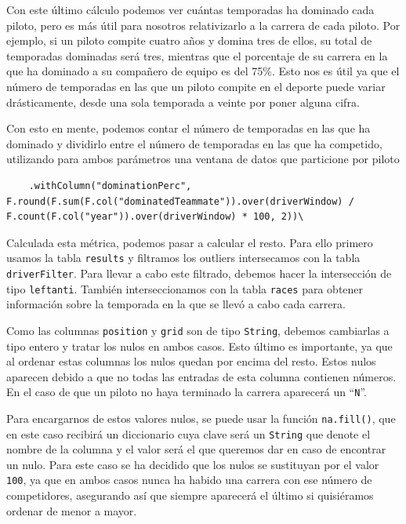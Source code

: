 \documentclass[12pt,twoside,titlepage]{report}
\newcommand{\quotes}[1]{``#1''}
\begin{document}
Con este último cálculo podemos ver cuántas temporadas ha dominado cada piloto, pero es más útil para nosotros relativizarlo a la carrera de cada piloto. Por ejemplo, si un piloto compite cuatro años y domina tres de ellos, su total de temporadas dominadas será tres, mientras que el porcentaje de su carrera en la que ha dominado a su compañero de equipo es del 75\%. Esto nos es útil ya que el número de temporadas en las que un piloto compite en el deporte puede variar drásticamente, desde una sola temporada a veinte por poner alguna cifra.

Con esto en mente, podemos contar el número de temporadas en las que ha dominado y dividirlo entre el número de temporadas en las que ha competido, utilizando para ambos parámetros una ventana de datos que particione por piloto

\begin{lstlisting}
	.withColumn("dominationPerc", F.round(F.sum(F.col("dominatedTeammate")).over(driverWindow) / F.count(F.col("year")).over(driverWindow) * 100, 2))\
\end{lstlisting}

Calculada esta métrica, podemos pasar a calcular el resto. Para ello primero usamos la tabla \texttt{results} y filtramos los outliers intersecamos con la tabla \texttt{driverFilter}. Para llevar a cabo este filtrado, debemos hacer la intersección de tipo \texttt{leftanti}. También interseccionamos con la tabla \texttt{races} para obtener información sobre la temporada en la que se llevó a cabo cada carrera.

Como las columnas \texttt{position} y \texttt{grid} son de tipo \texttt{String}, debemos cambiarlas a tipo entero y tratar los nulos en ambos casos. Esto último es importante, ya que al ordenar estas columnas los nulos quedan por encima del resto. Estos nulos aparecen debido a que no todas las entradas de esta columna contienen números. En el caso de que un piloto no haya terminado la carrera aparecerá un \quotes{\texttt{N}}.

Para encargarnos de estos valores nulos, se puede usar la función \texttt{na.fill()}, que en este caso recibirá un diccionario cuya clave será un \texttt{String} que denote el nombre de la columna y el valor será el que queremos dar en caso de encontrar un nulo. Para este caso se ha decidido que los nulos se sustituyan por el valor \texttt{100}, ya que en ambos casos nunca ha habido una carrera con ese número de competidores, asegurando así que siempre aparecerá el último si quisiéramos ordenar de menor a mayor.
\end{document}
